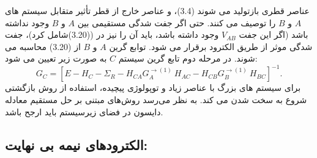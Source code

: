 عناصر قطری بازتولید می شوند (3.4)، و عناصر خارج از قطر تأثیر متقابل سیستم های $A$ و $B$ را توصیف می کنند. حتی اگر جفت شدگی مستقیمی بین $A$ و $B$ وجود نداشته باشد (اگر این جفت $V_{AB}$ وجود داشته باشد، باید آن را نیز در ((3.20)شامل کرد)، جفت شدگی موثر از طریق الکترود برقرار می شود.
توابع گرین $A$ و $B$ از (3.20) محاسبه می شوند. در مرحله دوم تابع گرین سیستم $C$ به صورت زیر تعیین می شود:
\begin{equation}
    {{G}_{C}}={{\left[ E-{{H}_{C}}-{{\Sigma }_{R}}-{{H}_{CA}}G_{A}^{\to (1)}\ {{H}_{AC}}-{{H}_{CB}}G_{B}^{\to (1)}\ {{H}_{BC}} \right]}^{-1}}.
\end{equation}
برای سیستم های بزرگ با عناصر زیاد و توپولوژی پیچیده، استفاده از روش بازگشتی شروع به سخت شدن می کند. به نظر می‌رسد روش‌های مبتنی بر حل مستقیم معادله دایسون در فضای زیرسیستم باید ارجح باشد. 

\subsection{الکترودهای نیمه بی نهایت:}

